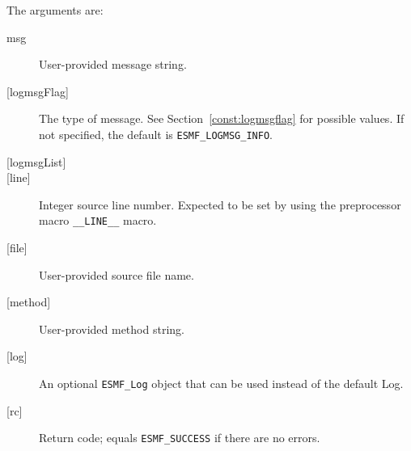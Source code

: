         The arguments are:
        \begin{description}
  
        \item [msg]
              User-provided message string.
        \item [{[logmsgFlag]}]
              The type of message.  See Section~\ref{const:logmsgflag} for
              possible values.  If not specified, the default is {\tt ESMF\_LOGMSG\_INFO}.
        \item [{[logmsgList]}]
        \item [{[line]}]
              Integer source line number.  Expected to be set by
              using the preprocessor macro {\tt \_\_LINE\_\_} macro.
        \item [{[file]}]
              User-provided source file name.
        \item [{[method]}]
              User-provided method string.
        \item [{[log]}]
              An optional {\tt ESMF\_Log} object that can be used instead
              of the default Log.
        \item [{[rc]}]
              Return code; equals {\tt ESMF\_SUCCESS} if there are no errors.
        \end{description}
  
\setlength{\parskip}{\oldparskip}
\setlength{\parindent}{\oldparindent}
\setlength{\baselineskip}{\oldbaselineskip}
